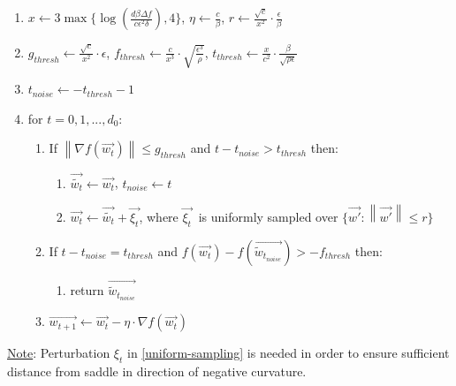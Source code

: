 \documentclass[12pt]{article}
\newcommand{\norm}[1]{\left\| #1 \right\|}
\begin{document}
	\begin{enumerate}[label*=\arabic*.]
        \item $ x \leftarrow 3\max\{\log(\frac{d\beta \Delta f} {c \epsilon^2 \delta}),4\}$, $\eta \leftarrow \frac{c}{\beta}$, $r \leftarrow \frac{\sqrt{c}}{x^2}\cdot\frac{\epsilon}{\beta}$
        \item $ g_{thresh} \leftarrow \frac{\sqrt{c}}{x^2}\cdot\epsilon$, $ f_{thresh} \leftarrow \frac{c}{x^3}\cdot\sqrt{\frac{\epsilon^3}{\rho}}$, $t_{thresh} \leftarrow \frac{x}{c^2} \cdot \frac{\beta}{\sqrt{\rho\epsilon}}$
        \item $t_{noise} \leftarrow -t_{thresh}-1$
        \item for $t=0, 1, ..., d_0:$
        \begin{enumerate}[label*=\arabic*.]
            \item If $\norm{\nabla{f(\overrightarrow{w_t})}} \leq g_{thresh}$ and $t-t_{noise} > t_{thresh}$ then:
            \begin{enumerate}[label*=\arabic*.]
                \item $\overrightarrow{\tilde{w_t}} \leftarrow \overrightarrow{w_t}$, $t_{noise} \leftarrow t$
                \item {\label{uniform-sampling}}$\overrightarrow{w_t} \leftarrow \overrightarrow{\tilde{w_t}} + \overrightarrow{\xi_t}$, where $\overrightarrow{\xi_t} ~ $ is uniformly sampled over $\{\overrightarrow{w'}:\norm{\overrightarrow{w'}} \leq r\}$
            \end{enumerate}
            \item If $t-t_{noise} = t_{thresh}$ and $f(\overrightarrow{w_t}) - f(\overrightarrow{\tilde{w}_{t_{noise}}}) > -f_{thresh}$ then:
            \begin{enumerate}[label*=\arabic*.]
                \item return $\overrightarrow{\tilde{w}_{t_{noise}}}$
            \end{enumerate}
            \item $\overrightarrow{w_{t+1}} \leftarrow \overrightarrow{w_t} - \eta \cdot \nabla{f}(\overrightarrow{w_t})$
      \end{enumerate}
    \end{enumerate}
    \noindent\underline{Note}:
    Perturbation ${\xi_t}$ in \eqref{uniform-sampling} is needed in order to ensure sufficient distance from saddle in direction of negative curvature.
\end{document}
